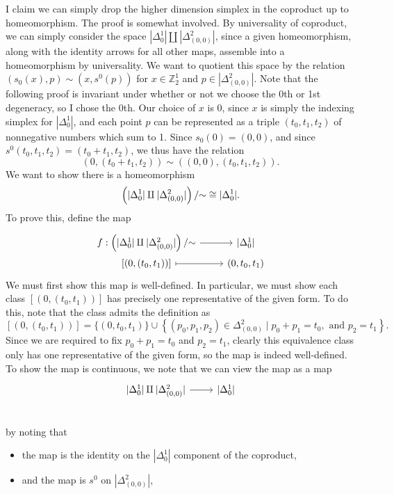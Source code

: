 \begin{example}
    I claim we can simply drop the higher dimension simplex in the coproduct up to homeomorphism. The proof is somewhat involved. By universality of coproduct, we can simply consider the space $|\Delta_0^1|\amalg|\Delta_{(0,0)}^2|$, since a given homeomorphism, along with the identity arrows for all other maps, assemble into a homeomorphism by universality. We want to quotient this space by the relation $(s_0(x),p)\sim (x,s^0(p))$ for $x\in \mathbb{Z}_2^1$ and $p\in|\Delta_{(0,0)}^2|$. Note that the following proof is invariant under whether or not we choose the 0th or 1st degeneracy, so I chose the 0th. Our choice of $x$ is $0$, since $x$ is simply the indexing simplex for $|\Delta_0^1|$, and each point $p$ can be represented as a triple $(t_0,t_1,t_2)$ of nonnegative numbers which sum to 1. Since $s_0(0)=(0,0)$, and since $s^0(t_0,t_1,t_2)=(t_0+t_1,t_2)$, we thus have the relation
    \[
    (0,(t_0+t_1,t_2))\sim((0,0),(t_0,t_1,t_2)).
    \]
    We want to show there is a homeomorphism
    \[
    \left(|\Delta_0^1|\amalg|\Delta_{(0,0)}^2|\right)/\mathbin{\sim} \cong |\Delta_0^1|.
    \]
    To prove this, define the map
    \[\begin{tikzcd}[row sep=0em]
	{    f : \left(|\Delta_0^1|\amalg|\Delta_{(0,0)}^2|\right)/\tildesim} & {|\Delta_0^1|} \\
	{[(0,(t_0,t_1))]} & {(0,t_0,t_1)}
	\arrow[from=1-1, to=1-2]
	\arrow[maps to, from=2-1, to=2-2]
\end{tikzcd}\]
    We must first show this map is well-defined. In particular, we must show each class $[(0,(t_0,t_1))]$ has precisely one representative of the given form. To do this, note that the class admits the definition as
    \[
    [(0,(t_0,t_1))] = \{(0,t_0,t_1)\}\cup\left\{(p_0,p_1,p_2)\in\Delta_{(0,0)}^2 \mid p_0+p_1=t_0,\text{ and }p_2=t_1\right\}.
    \]
    Since we are required to fix $p_0+p_1=t_0$ and $p_2=t_1$, clearly this equivalence class only has one representative of the given form, so the map is indeed well-defined. To show the map is continuous, we note that we can view the map as a map
    \[\begin{tikzcd}      
	{    |\Delta_0^1|\amalg|\Delta_{(0,0)}^2|}\ar[r] & {|\Delta_0^1|} \\
    \end{tikzcd}\]
    by noting that
    \begin{itemize}
        \item the map is the identity on the $|\Delta^1_0|$ component of the coproduct,
        \item and the map is $s^0$ on $| \Delta ^2_{(0,0)} | $,

\end{itemize}
\end{example}
